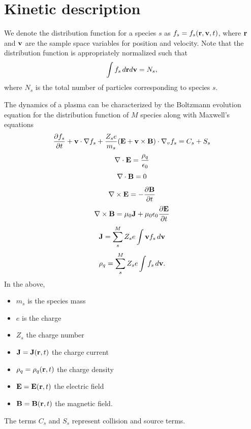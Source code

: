 \documentclass[a4paper,11pt]{report}
\begin{document}
\section{Kinetic description}
We denote the distribution function for a species $s$ as $f_s = f_s(\mathbf{r}, \mathbf{v}, t)$, where $\mathbf{r}$ and $\mathbf{v}$ are the sample space variables for position and velocity. Note that the distribution function is appropriately normalized such that
\begin{equation}
\int f_s \, d\mathbf{r} d\mathbf{v} = N_s,
\end{equation}
where $N_s$ is the total number of particles corresponding to species $s$. 

The dynamics of a plasma can be characterized by the Boltzmann evolution equation for the distribution function of $M$ species along with Maxwell's equations
\begin{equation}
\label{eq:kinetic_equation}
\frac{\partial f_s}{\partial t} + \mathbf{v} \cdot \nabla f_s + \frac{Z_s e}{m_s} ( \mathbf{E} + \mathbf{v} \times \mathbf{B} ) \cdot \nabla_v f_s = C_s + S_s
\end{equation}
\begin{equation}
\label{eq:maxwell_3}
\nabla \cdot \mathbf{E} = \frac{\rho_q}{\epsilon_0} 
\end{equation}
\begin{equation}
\label{eq:maxwell_4}
\nabla \cdot \mathbf{B} = 0
\end{equation}
\begin{equation}
\label{eq:maxwell_1}
\nabla \times \mathbf{E} = -\frac{ \partial \mathbf{B}}{\partial t}
\end{equation}
\begin{equation}
\label{eq:maxwell_2}
\nabla \times \mathbf{B} = \mu_0 \mathbf{J} + \mu_0 \epsilon_0 \frac{\partial \mathbf{E}}{\partial t}
\end{equation}
\begin{equation}
\mathbf{J} = \sum_s^M Z_s e \int \mathbf{v} f_s \, d\mathbf{v}
\end{equation}
\begin{equation}
\rho_q = \sum_s^M Z_s e \int f_s \, d\mathbf{v}.
\end{equation}
In the above, 
\begin{itemize}
\item $m_s$ is the species mass
\item $e$ is the charge
\item $Z_s$ the charge number
\item $\mathbf{J} = \mathbf{J}(\mathbf{r},t)$ the charge current
\item $\rho_q = \rho_q(\mathbf{r},t)$ the charge density
\item $\mathbf{E} = \mathbf{E}(\mathbf{r},t)$ the electric field
\item $\mathbf{B} = \mathbf{B}(\mathbf{r},t)$ the magnetic field.
\end{itemize}
The terms $C_s$ and $S_s$ represent collision and source terms.
\end{document}
